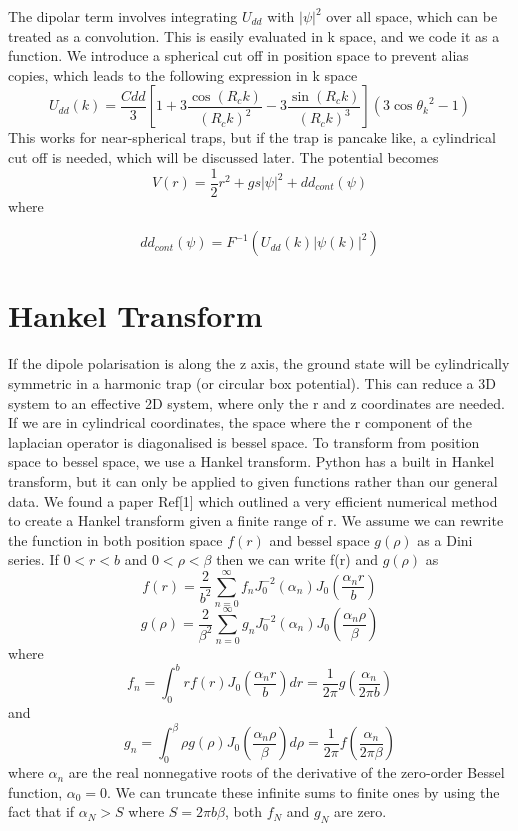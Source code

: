 \documentclass[12pt]{article}
\begin{document}
The dipolar term involves integrating $U_{dd}$ with $|\psi|^{2}$ over all space, which can be treated as a convolution. This is easily evaluated in k space, and we code it as a function. We introduce a spherical cut off in position space to prevent alias copies, which leads to the following expression in k space 
\begin{equation}
U_{dd}(k) = \frac{Cdd}{3}[1+3\frac{\cos(R_{c}k)}{(R_{c}k)^{2}}-3\frac{\sin(R_{c}k)}{(R_{c}k)^{3}}](3\cos{\theta_k}^{2}-1)
\end{equation} 
This works for near-spherical traps, but if the trap is pancake like, a cylindrical cut off is needed, which will be discussed later.
The potential becomes
\begin{equation}
V(r) = \frac{1}{2}r^{2}+gs|\psi|^{2}+dd_{cont}(\psi)
\end{equation}
where 

\begin{equation}
dd_{cont}(\psi) = F^{-1}(U_{dd}(k)|\psi(k)|^{2})
\end{equation}
\section{Hankel Transform}
If the dipole polarisation is along the z axis, the ground state will be cylindrically symmetric in a harmonic trap (or circular box potential). This can reduce a 3D system to an effective 2D system, where only the r and z coordinates are needed. If we are in cylindrical coordinates, the space where the r component of the laplacian operator is diagonalised is bessel space. To transform from position space to bessel space, we use a Hankel transform. Python has a built in Hankel transform, but it can only be applied to given functions rather than our general data. We found a paper Ref[1] which outlined a very efficient numerical method to create a Hankel transform given a finite range of r. We assume we can rewrite the function in both position space $f(r)$ and bessel space $g(\rho)$ as a Dini series. If $0<r<b$ and $0<\rho<\beta$ then we can write f(r) and $g(\rho)$ as
\begin{equation}
f(r) = \frac{2}{b^{2}}\sum_{n=0}^{\infty}f_{n}J_{0}^{-2}(\alpha_{n})J_{0}(\frac{\alpha_{n}r}{b})
\end{equation}
\begin{equation}
g(\rho) = \frac{2}{\beta^{2}}\sum_{n=0}^{\infty}g_{n}J_{0}^{-2}(\alpha_{n})J_{0}(\frac{\alpha_{n}\rho}{\beta})
\end{equation}
where 
\begin{equation}
f_{n} = \int_{0}^{b}rf(r)J_{0}(\frac{\alpha_{n}r}{b})dr=\frac{1}{2\pi}g(\frac{\alpha_{n}}{2\pi b})
\end{equation}
and
\begin{equation}
g_{n} = \int_{0}^{\beta}\rho g(\rho)J_{0}(\frac{\alpha_{n}\rho}{\beta})d\rho=\frac{1}{2\pi}f(\frac{\alpha_{n}}{2\pi\beta})
\end{equation}
where $\alpha_{n}$ are the real nonnegative roots of the derivative of the zero-order Bessel function, $\alpha_{0}=0$. We can truncate these infinite sums to finite ones by using the fact that if $\alpha_{N} >S$ where $S=2\pi b\beta$, both $f_{N}$ and $g_{N}$ are zero.
\end{document}
